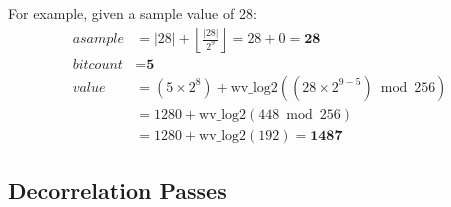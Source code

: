 \par
\noindent
For example, given a sample value of 28:
\begin{align*}
asample &= |28| + \left\lfloor\frac{|28|}{2^9}\right\rfloor = 28 + 0 = \textbf{28} \\
bitcount &= \textbf{5} \\
value &= (5 \times 2^8) + \text{wv\_log2}((28 \times 2^{9 - 5}) \bmod{256}) \\
&= 1280 + \text{wv\_log2}(448 \bmod{256}) \\
&= 1280 + \text{wv\_log2}(192) = \textbf{1487}
\end{align*}

\clearpage

\subsection{Decorrelation Passes}

